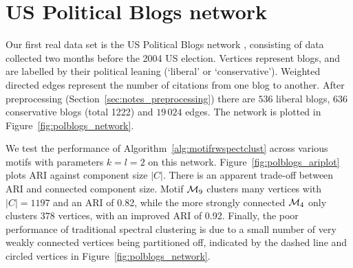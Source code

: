 \section{US Political Blogs network} \label{sec:motif_polblogs}

Our first real data set is the US Political Blogs network \cite{adamic2005political}, consisting of data collected two months before the 2004 US election. Vertices represent blogs, and are labelled by their political leaning (`liberal' or `conservative'). Weighted directed edges represent the number of citations from one blog to another. After preprocessing (Section~\ref{sec:notes_preprocessing}) there are $536$ liberal blogs, $636$ conservative blogs (total 1222) and $19 \, 024$ edges. The network is plotted in Figure~\ref{fig:polblogs_network}.

We test the performance of Algorithm~\ref{alg:motifrwspectclust} across various motifs with parameters $k=l=2$ on this network.
Figure~\ref{fig:polblogs_ariplot} plots ARI against component size $|C|$.
There is an apparent trade-off between ARI and connected component size.
Motif $\mathcal{M}_9$ clusters many vertices with $|C|=1197$ and an ARI of 0.82, while the more strongly connected $\mathcal{M}_4$ only clusters $378$ vertices, with an improved ARI of 0.92.
Finally, the poor performance of traditional spectral clustering is due to a small number of very weakly connected vertices being partitioned off, indicated by the dashed line and circled vertices in Figure~\ref{fig:polblogs_network}.


